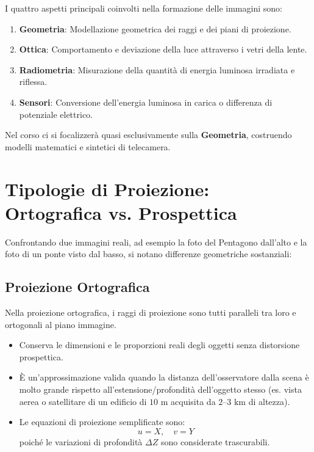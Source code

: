 I quattro aspetti principali coinvolti nella formazione delle immagini sono:
\begin{enumerate}
    \item \textbf{Geometria}: Modellazione geometrica dei raggi e dei piani di proiezione.
    \item \textbf{Ottica}: Comportamento e deviazione della luce attraverso i vetri della lente.
    \item \textbf{Radiometria}: Misurazione della quantità di energia luminosa irradiata e riflessa.
    \item \textbf{Sensori}: Conversione dell'energia luminosa in carica o differenza di potenziale elettrico.
\end{enumerate}
Nel corso ci si focalizzerà quasi esclusivamente sulla \textbf{Geometria}, costruendo modelli matematici e sintetici di telecamera.

\section{Tipologie di Proiezione: Ortografica vs. Prospettica}
Confrontando due immagini reali, ad esempio la foto del Pentagono dall'alto e la foto di un ponte visto dal basso, si notano differenze geometriche sostanziali:

\subsection{Proiezione Ortografica}
Nella proiezione ortografica, i raggi di proiezione sono tutti paralleli tra loro e ortogonali al piano immagine. 
\begin{itemize}
    \item Conserva le dimensioni e le proporzioni reali degli oggetti senza distorsione prospettica.
    \item È un'approssimazione valida quando la distanza dell'osservatore dalla scena è molto grande rispetto all'estensione/profondità dell'oggetto stesso (es. vista aerea o satellitare di un edificio di $10\text{ m}$ acquisita da $2\text{--}3\text{ km}$ di altezza).
    \item Le equazioni di proiezione semplificate sono:
    \begin{equation}
        u = X, \quad v = Y
    \end{equation}
    poiché le variazioni di profondità $\Delta Z$ sono considerate trascurabili.
\end{itemize}

